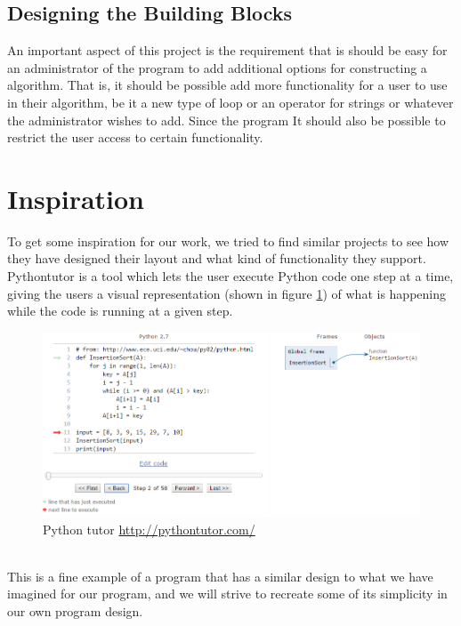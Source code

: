 \documentclass[11pt]{article}
\begin{document}
\subsection{Designing the Building Blocks}
An important aspect of this project is the requirement that is should be easy for an administrator of the program to add additional options for constructing a algorithm. That is, it should be possible add more functionality for a user to use in their algorithm, be it a new type of loop or an operator for strings or whatever the administrator wishes to add. Since the program It should also be possible to restrict the user access to certain functionality. 

\section{Inspiration}
To get some inspiration for our work, we tried to find similar projects to see how they have designed their layout and what kind of functionality they support.\\
Pythontutor  \citep{pythontutor} is a tool which lets the user execute Python code one step at a time, giving the users a visual representation (shown in figure \ref{pythontutor}) of what is happening while the code is running at a given step\citep{Guo:2013:OPT:2445196.2445368}.\\
\begin{figure}[h]
	\centering
	\includegraphics[scale=0.4]{img/pytutins1.PNG}
    \caption{Python tutor \url{http://pythontutor.com/}}
    \label{pythontutor}
\end{figure}\\
This is a fine example of a program that has a similar design to what we have imagined for our program, and we will strive to recreate some of its simplicity in our own program design.
\end{document}
